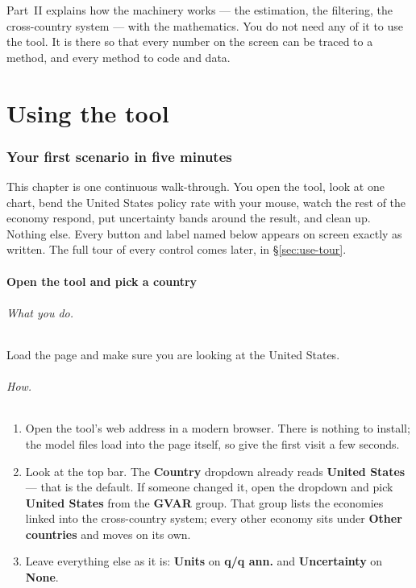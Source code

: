 \documentclass[11pt]{article}
\theoremstyle{definition}
\theoremstyle{remark}
\begin{document}
Part~II explains how the machinery works --- the estimation, the filtering, the cross-country
system --- with the mathematics. You do not need any of it to use the tool. It is there so that
every number on the screen can be traced to a method, and every method to code and data.

\part{Using the tool}\label{part:using}

\section{Your first scenario in five minutes}\label{sec:use-quickstart}

This chapter is one continuous walk-through. You open the tool, look at one chart,
bend the United States policy rate with your mouse, watch the rest of the economy
respond, put uncertainty bands around the result, and clean up. Nothing else. Every
button and label named below appears on screen exactly as written. The full tour of
every control comes later, in \S\ref{sec:use-tour}.

\subsection{Open the tool and pick a country}

\paragraph{What you do.} Load the page and make sure you are looking at the United
States.

\paragraph{How.}
\begin{enumerate}
  \item Open the tool's web address in a modern browser. There is nothing to
    install; the model files load into the page itself, so give the first visit a
    few seconds.
  \item Look at the top bar. The \textbf{Country} dropdown already reads
    \textbf{United States} --- that is the default. If someone changed it, open the
    dropdown and pick \textbf{United States} from the \textbf{GVAR} group. That
    group lists the economies linked into the cross-country system; every other
    economy sits under \textbf{Other countries} and moves on its own.
  \item Leave everything else as it is: \textbf{Units} on \textbf{q/q ann.} and
    \textbf{Uncertainty} on \textbf{None}.
\end{enumerate}
\end{document}
